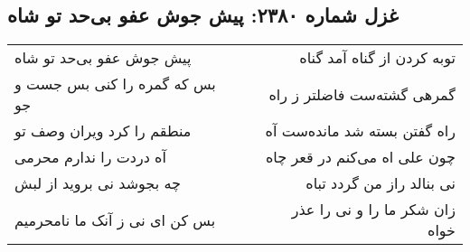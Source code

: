 \begin{center}
\section*{غزل شماره ۲۳۸۰: پیش جوش عفو بی‌حد تو شاه}
\label{sec:2380}
\begin{longtable}{l p{0.5cm} r}
پیش جوش عفو بی‌حد تو شاه
&&
توبه کردن از گناه آمد گناه
\\
بس که گمره را کنی بس جست و جو
&&
گمرهی گشته‌ست فاضلتر ز راه
\\
منطقم را کرد ویران وصف تو
&&
راه گفتن بسته شد مانده‌ست آه
\\
آه دردت را ندارم محرمی
&&
چون علی اه می‌کنم در قعر چاه
\\
چه بجوشد نی بروید از لبش
&&
نی بنالد راز من گردد تباه
\\
بس کن ای نی ز آنک ما نامحرمیم
&&
زان شکر ما را و نی را عذر خواه
\\
\end{longtable}
\end{center}
